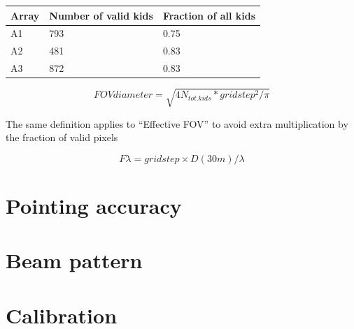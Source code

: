 \documentclass[a4paper, 11pt]{article} %
\begin{document}
\begin{table}
\begin{tabular}{|l|l|l|}
\hline
Array & Number of valid kids & Fraction of all kids\\
\hline
A1 & 793 & 0.75\\
A2 & 481 & 0.83\\
A3 & 872 & 0.83\\
\hline
\end{tabular}
\end{table}

\begin{equation}
FOV diameter = \sqrt{4 N_{tot. kids} * gridstep^2/\pi}
\end{equation}

The same definition applies to ``Effective FOV'' to avoid extra multiplication
by the fraction of valid pixels

\begin{equation}
F\lambda = gridstep\times D(30m)/\lambda
\end{equation}


\section{Pointing accuracy}
\label{se:pointing}


\section{Beam pattern}
\label{se:beams}



\section{Calibration}
\label{se:calibration}


\end{document}

